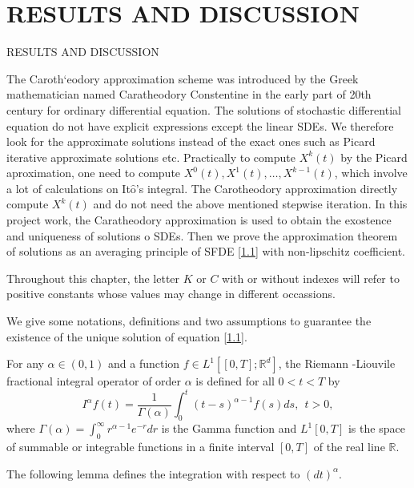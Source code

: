 \documentclass[unknownkeysallowed, compress]{beamer}
\theoremstyle{plain}
\begin{document}
\section{RESULTS AND DISCUSSION}
\begin{frame}[allowframebreaks]{RESULTS AND DISCUSSION}
\par The Caroth`eodory approximation scheme was introduced by the Greek mathematician named Caratheodory Constentine in the early part of 20th century for ordinary differential equation. The solutions of stochastic differential equation do not have explicit expressions except the linear SDEs. We therefore look for the approximate solutions instead of the exact ones such as Picard iterative approximate solutions etc. Practically to compute $X^k(t)$ by the Picard aproximation, one need to compute $X^0(t), X^{1}(t),\ldots,X^{k-1}(t)$, which involve a lot of calculations on It$\hat{\mbox{o}}$'s integral. The Carotheodory approximation directly compute $X^k(t)$ and do not need the above mentioned stepwise iteration. In this project work, the Caratheodory approximation is used to obtain the exostence and uniqueness of solutions o SDEs. Then we prove the approximation theorem of solutions as an averaging principle of SFDE \eqref{1.1} with non-lipschitz coefficient.
\par Throughout this chapter, the letter $K$ or $C$ with or without indexes will refer to positive constants whose values may change in different occassions.\\
\par We give some notations, definitions and two assumptions to guarantee the existence of the unique solution of equation \eqref{1.1}. 


\begin{definition}\label{d2.1}
\normalfont
For any $\alpha\in(0,1)$ and a function $f\in L^1[[0,T];\mathbb{R}^d]$, the Riemann -Liouvile fractional integral operator of order $\alpha$ is defined for all $0<t<T$ by 
$$
I^\alpha f(t) = \frac{1}{\Gamma(\alpha)}\int_0^t(t-s)^{\alpha-1}f(s)ds,~~t>0,
$$
where $\Gamma(\alpha) = \int_0^\infty r^{\alpha-1}e^{-r}dr$ is the Gamma function and $L^1[0, T ]$ is the space of summable or integrable functions in a finite interval $[0,T]$ of the real line $\mathbb{R}$.
\end{definition}
The following lemma defines the integration with respect to $(dt)^\alpha$.


\end{frame}
\end{document}
